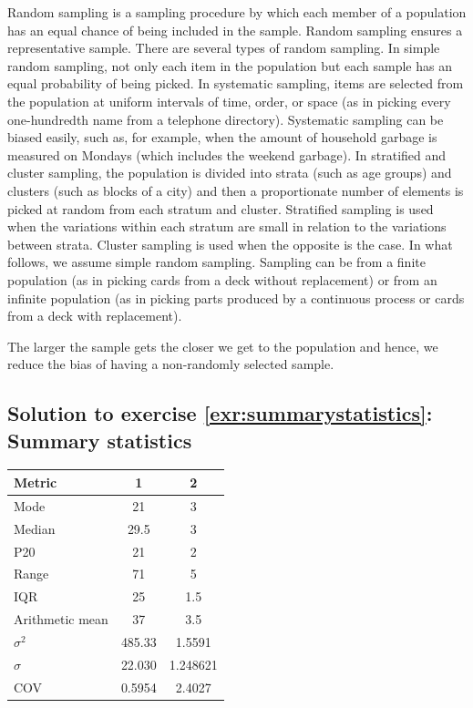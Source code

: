 \documentclass[
  12pt,
  oneside]{book}
\theoremstyle{definition}
\theoremstyle{definition}
\theoremstyle{definition}
\theoremstyle{definition}
\theoremstyle{remark}
\begin{document}
Random sampling is a sampling procedure by which each member of a population has an equal
chance of being included in the sample. Random sampling ensures a representative sample. There
are several types of random sampling. In simple random sampling, not only each item in the
population but each sample has an equal probability of being picked. In systematic sampling,
items are selected from the population at uniform intervals of time, order, or space (as in picking
every one-hundredth name from a telephone directory). Systematic sampling can be biased easily,
such as, for example, when the amount of household garbage is measured on Mondays (which
includes the weekend garbage). In stratified and cluster sampling, the population is divided into
strata (such as age groups) and clusters (such as blocks of a city) and then a proportionate
number of elements is picked at random from each stratum and cluster. Stratified sampling is
used when the variations within each stratum are small in relation to the variations between
strata. Cluster sampling is used when the opposite is the case. In what follows, we assume
simple random sampling. Sampling can be from a finite population (as in picking cards from
a deck without replacement) or from an infinite population (as in picking parts produced by a
continuous process or cards from a deck with replacement).

The larger the sample gets the closer we get to the population and hence, we reduce the bias of
having a non-randomly selected sample.

\hypertarget{sol:summarystatistics}{%
\subsection*{Solution to exercise \ref{exr:summarystatistics}: Summary statistics}\label{sol:summarystatistics}}

\begin{longtable}[]{@{}lcc@{}}
\toprule\noalign{}
Metric & 1 & 2 \\
\midrule\noalign{}
\endhead
\bottomrule\noalign{}
\endlastfoot
Mode & 21 & 3 \\
Median & 29.5 & 3 \\
P20 & 21 & 2 \\
Range & 71 & 5 \\
IQR & 25 & 1.5 \\
Arithmetic mean & 37 & 3.5 \\
\(\sigma^2\) & 485.33 & 1.5591 \\
\(\sigma\) & 22.030 & 1.248621 \\
COV & 0.5954 & 2.4027 \\
\end{longtable}
\end{document}
